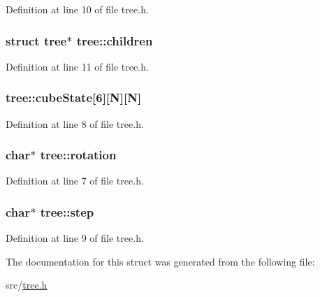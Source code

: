 Definition at line 10 of file tree.\-h.

\hypertarget{structtree_a3d696acca71e630b72bc38b56998c926}{
\subsubsection[{children}]{\setlength{\rightskip}{0pt plus 5cm}struct {\bf tree}$\ast$ tree\-::children}}\label{structtree_a3d696acca71e630b72bc38b56998c926}


Definition at line 11 of file tree.\-h.

\hypertarget{structtree_a64a4cf7c5410c94da00989faeb3050f3}{
\subsubsection[{cube\-State}]{ tree\-::cube\-State\mbox{[}6\mbox{]}\mbox{[}{\bf N}\mbox{]}\mbox{[}{\bf N}\mbox{]}}}\label{structtree_a64a4cf7c5410c94da00989faeb3050f3}


Definition at line 8 of file tree.\-h.

\hypertarget{structtree_a32f3d9d990eda2f7dd4941ee8c42daae}{
\subsubsection[{rotation}]{\setlength{\rightskip}{0pt plus 5cm}char$\ast$ tree\-::rotation}}\label{structtree_a32f3d9d990eda2f7dd4941ee8c42daae}


Definition at line 7 of file tree.\-h.

\hypertarget{structtree_af079d2aa4e7d5e37d47749e6a6e66602}{
\subsubsection[{step}]{\setlength{\rightskip}{0pt plus 5cm}char$\ast$ tree\-::step}}\label{structtree_af079d2aa4e7d5e37d47749e6a6e66602}


Definition at line 9 of file tree.\-h.



The documentation for this struct was generated from the following file\-:\begin{DoxyCompactItemize}
\item 
src/\hyperlink{tree_8h}{tree.\-h}\end{DoxyCompactItemize}
